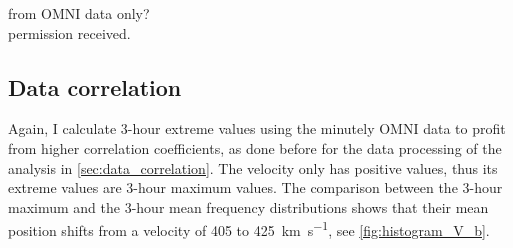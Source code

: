 from OMNI data only?\\
permission received.\\


\subsection{Data correlation}
Again, I calculate 3-hour extreme values using the minutely OMNI data to profit from higher correlation coefficients, as done before for the data processing of the \vBz{} analysis in \autoref{sec:data_correlation}. The velocity only has positive values, thus its extreme values are 3-hour maximum values. The comparison between the 3-hour maximum and the 3-hour mean frequency distributions shows that their mean position shifts from a velocity of 405 to \SI{425}{\km\per\s}, see \autoref{fig:histogram_V_b}.
